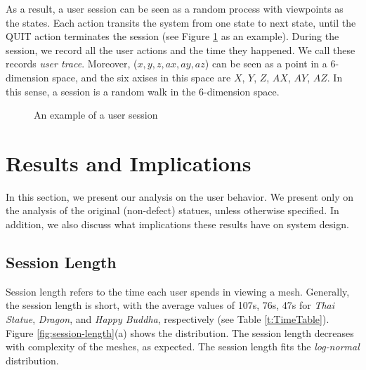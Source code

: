 As a result, a user session can be seen as a random process 
with viewpoints as the states. Each action transits
the system from one state to next state, until the QUIT
action terminates the session (see Figure \ref{f:user:transition} as an example). 
During the session, we record
all the user actions and the time they happened.  We call these 
records \textit{user trace}.
Moreover, ($x, y, z, ax, ay, az$) can be seen as a point in a 6-dimension space, and
the six axises in this space are $X$, $Y$, $Z$, $AX$, $AY$, $AZ$. 
In this sense, a session is a random walk in the 6-dimension space.
\begin{figure}
    \centering
    \caption{An example of a user session}
    \label{f:user:transition}
\end{figure}


\section{Results and Implications}
In this section, we present our analysis on the user behavior. We present only on the analysis of the original (non-defect) statues, unless otherwise specified.
In addition, we also discuss what implications these results have on system design.

\subsection{Session Length}
Session length refers to the time each user spends in viewing a mesh. 
Generally, the session length is short, with the average values of 107s, 76s, 47s for \textit{Thai Statue}, 
\textit{Dragon}, and \textit{Happy Buddha}, respectively (see Table \ref{t:TimeTable}). 
Figure \ref{fig:session-length}(a) shows the distribution. 
The session length decreases with complexity of the meshes, as expected. 
The session length fits the \textit{log-normal} distribution.


